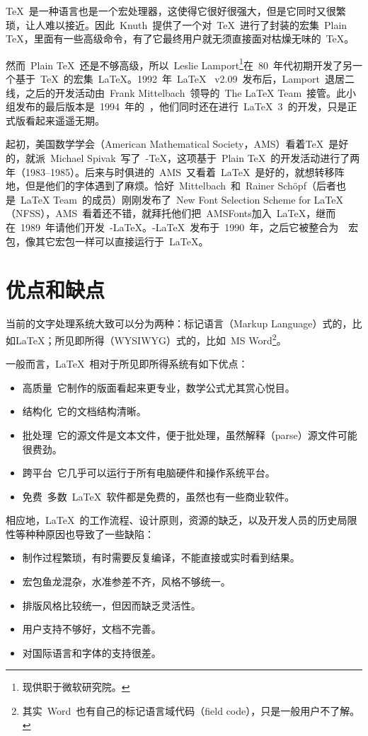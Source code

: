\TeX~是一种语言也是一个宏处理器，这使得它很好很强大，但是它同时又很繁琐，让人难以接近。因此~Knuth~提供了一个对~\TeX~进行了封装的宏集~Plain \TeX，里面有一些高级命令，有了它最终用户就无须直接面对枯燥无味的~\TeX。

然而~Plain \TeX~还是不够高级，所以~Leslie Lamport\footnote{现供职于微软研究院。}在~80~年代初期开发了另一个基于~\TeX~的宏集~\LaTeX。1992~年~\LaTeX~ v2.09~发布后，Lamport~退居二线，之后的开发活动由~Frank Mittelbach~领导的~The LaTeX Team~接管。此小组发布的最后版本是~1994~年的~\LaTeXe，他们同时还在进行~\LaTeX~3~的开发，只是正式版看起来遥遥无期。

起初，美国数学学会（American Mathematical Society，AMS）看着\TeX~是好的，就派~Michael Spivak~写了~\AmS-\TeX，这项基于~Plain \TeX~的开发活动进行了两年（1983--1985）。后来与时俱进的~AMS~又看着~\LaTeX~是好的，就想转移阵地，但是他们的字体遇到了麻烦。恰好~Mittelbach~和~Rainer Schöpf（后者也是~LaTeX Team~的成员）刚刚发布了~New Font Selection Scheme for \LaTeX（NFSS），AMS~看着还不错，就拜托他们把~AMSFonts加入~\LaTeX，继而在~1989~年请他们开发~\AmS-\LaTeX。\AmS-\LaTeX~发布于~1990~年，之后它被整合为~\AmS~宏包，像其它宏包一样可以直接运行于~\LaTeX。

\section{优点和缺点}
当前的文字处理系统大致可以分为两种：标记语言（Markup Language）式的，比如\LaTeX；所见即所得（WYSIWYG）式的，比如~MS Word\footnote{其实~Word~也有自己的标记语言域代码（field code），只是一般用户不了解。}。

一般而言，\LaTeX~相对于所见即所得系统有如下优点：
\begin{itemize}
    \item 高质量\ 它制作的版面看起来更专业，数学公式尤其赏心悦目。
    \item 结构化\ 它的文档结构清晰。
    \item 批处理\ 它的源文件是文本文件，便于批处理，虽然解释（parse）源文件可能很费劲。
    \item 跨平台\ 它几乎可以运行于所有电脑硬件和操作系统平台。
    \item 免费\ 多数~\LaTeX~软件都是免费的，虽然也有一些商业软件。
\end{itemize}

相应地，\LaTeX~的工作流程、设计原则，资源的缺乏，以及开发人员的历史局限性等种种原因也导致了一些缺陷：
\begin{itemize}
    \item 制作过程繁琐，有时需要反复编译，不能直接或实时看到结果。
    \item 宏包鱼龙混杂，水准参差不齐，风格不够统一。
    \item 排版风格比较统一，但因而缺乏灵活性。
    \item 用户支持不够好，文档不完善。
    \item 对国际语言和字体的支持很差。
\end{itemize}

